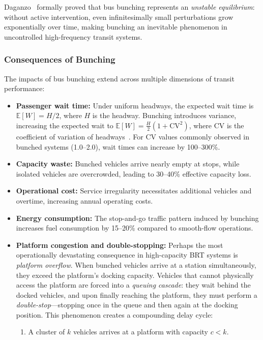 Daganzo~\cite{daganzo2009headway} formally proved that bus bunching represents an \textit{unstable equilibrium}: without active intervention, even infinitesimally small perturbations grow exponentially over time, making bunching an inevitable phenomenon in uncontrolled high-frequency transit systems.

\subsubsection{Consequences of Bunching}

The impacts of bus bunching extend across multiple dimensions of transit performance:

\begin{itemize}
    \item \textbf{Passenger wait time:} Under uniform headways, the expected wait time is $\mathbb{E}[W] = H/2$, where $H$ is the headway. Bunching introduces variance, increasing the expected wait to $\mathbb{E}[W] = \frac{H}{2}\left(1 + \text{CV}^2\right)$, where CV is the coefficient of variation of headways~\cite{osuna1972control}. For CV values commonly observed in bunched systems (1.0--2.0), wait times can increase by 100--300\%.
    \item \textbf{Capacity waste:} Bunched vehicles arrive nearly empty at stops, while isolated vehicles are overcrowded, leading to 30--40\% effective capacity loss.
    \item \textbf{Operational cost:} Service irregularity necessitates additional vehicles and overtime, increasing annual operating costs.
    \item \textbf{Energy consumption:} The stop-and-go traffic pattern induced by bunching increases fuel consumption by 15--20\% compared to smooth-flow operations.
    \item \textbf{Platform congestion and double-stopping:} Perhaps the most operationally devastating consequence in high-capacity BRT systems is \textit{platform overflow}. When bunched vehicles arrive at a station simultaneously, they exceed the platform's docking capacity. Vehicles that cannot physically access the platform are forced into a \textit{queuing cascade}: they wait behind the docked vehicles, and upon finally reaching the platform, they must perform a \textit{double-stop}---stopping once in the queue and then again at the docking position. This phenomenon creates a compounding delay cycle:
    \begin{enumerate}
        \item A cluster of $k$ vehicles arrives at a platform with capacity $c < k$.

\end{enumerate}
\end{itemize}
